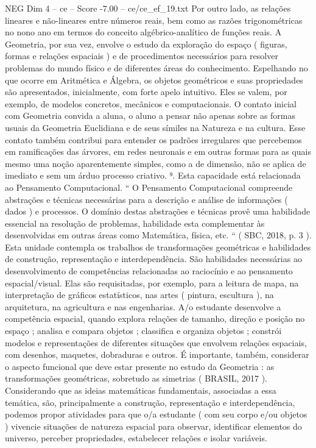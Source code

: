 \begin{textsample}{NEG Dim 4 – ce – Score -7.00 – ce/ce\_ef\_19.txt}
Por outro lado, as relações lineares e não-lineares entre números reais, bem como as razões trigonométricas no nono ano em termos do conceito algébrico-analítico de funções reais.
A Geometria, por sua vez, envolve o estudo da exploração do espaço ( figuras, formas e relações espaciais ) e de procedimentos necessários para resolver problemas do mundo físico e de diferentes áreas do conhecimento.
Espelhando no que ocorre em Aritmética e Álgebra, os objetos geométricos e suas propriedades são apresentados, inicialmente, com forte apelo intuitivo.
Eles se valem, por exemplo, de modelos concretos, mecânicos e computacionais.
O contato inicial com Geometria convida a aluna, o aluno a pensar não apenas sobre as formas usuais da Geometria Euclidiana e de seus símiles na Natureza e na cultura.
Esse contato também contribui para entender os padrões irregulares que percebemos em ramificações das árvores, em redes neuronais e em outras formas para as quais mesmo uma noção aparentemente simples, como a de dimensão, não se aplica de imediato e sem um árduo processo criativo. ⁹.
Esta capacidade está relacionada ao Pensamento Computacional. “ O Pensamento Computacional compreende abstrações e técnicas necessárias para a descrição e análise de informações ( dados ) e processos.
O domínio destas abstrações e técnicas provê uma habilidade essencial na resolução de problemas, habilidade esta complementar às desenvolvidas em outras áreas como Matemática, física, etc. “ ( SBC, 2018, p. 3 ).
Esta unidade contempla os trabalhos de transformações geométricas e habilidades de construção, representação e interdependência.
São habilidades necessárias ao desenvolvimento de competências relacionadas ao raciocínio e ao pensamento espacial/visual.
Elas são requisitadas, por exemplo, para a leitura de mapa, na interpretação de gráficos estatísticos, nas artes ( pintura, escultura ), na arquitetura, na agricultura e nas engenharias.
A/o estudante desenvolve a competência espacial, quando explora relações de tamanho, direção e posição no espaço ; analisa e compara objetos ; classifica e organiza objetos ; constrói modelos e representações de diferentes situações que envolvem relações espaciais, com desenhos, maquetes, dobraduras e outros.
É importante, também, considerar o aspecto funcional que deve estar presente no estudo da Geometria : as transformações geométricas, sobretudo as simetrias ( BRASIL, 2017 ).
Considerando que as ideias matemáticas fundamentais, associadas a essa temática, são, principalmente a construção, representação e interdependência, podemos propor atividades para que o/a estudante ( com seu corpo e/ou objetos ) vivencie situações de natureza espacial para observar, identificar elementos do universo, perceber propriedades, estabelecer relações e isolar variáveis.

\end{textsample}

